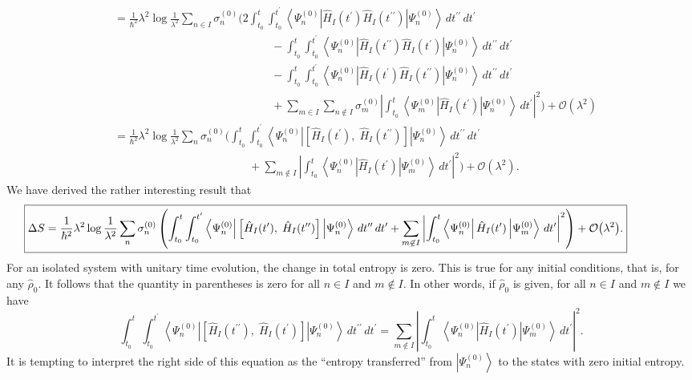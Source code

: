 \documentclass[11pt]{article}
\newcommand{\Od}[1]{\mathcal{O}{\left(#1\right)}}
\newcommand{\bra}[1]{\left\langle#1\right|}
\newcommand{\ket}[1]{\left|#1\right\rangle}
\newcommand{\op}[1]{\hat{#1}}
\theoremstyle{theorem}
\theoremstyle{remark}
\theoremstyle{step}
\theoremstyle{gap}
\begin{document}
\begin{align*}
&=\frac{1}{\hbar^2}\lambda^2 \log\frac{1}{\lambda^2} \sum_{n \in I} \sigma_n^{(0)} \Bigg(2\int_{t_0}^t \int_{t_0}^{t^\prime} \bra{\Psi_n^{(0)}} \op{H}_I (t^\prime) \op{H}_I(t^{\prime\prime}) \ket{\Psi_n^{(0)}}\,dt^{\prime\prime}\,dt^\prime  \\
&\hspace{14em}-\int_{t_0}^t \int_{t_0}^{t^\prime} \bra{\Psi_n^{(0)}} \op{H}_I (t^{\prime\prime})\op{H}_I (t^{\prime}) \ket{\Psi_n^{(0)}}\,dt^{\prime\prime}\,dt^\prime \\
&\hspace{14em}-\int_{t_0}^t \int_{t_0}^{t^\prime} \bra{\Psi_n^{(0)}} \op{H}_I (t^{\prime})\op{H}_I (t^{\prime\prime}) \ket{\Psi_n^{(0)}}\,dt^{\prime\prime}\,dt^\prime\\
&\hspace{14em}+\sum_{m \in I}\sum_{n\not\in I} \sigma_m^{(0)} \left| \int_{t_0}^t \bra{\Psi_m^{(0)}}\op{H}_I (t^\prime) \ket{\Psi_n^{(0)}}\,dt^\prime\right|^2 \Bigg) + \Od{\lambda^2} \\
&=\frac{1}{\hbar^2}\lambda^2 \log\frac{1}{\lambda^2} \sum_{n} \sigma_n^{(0)} \Bigg(\int_{t_0}^t \int_{t_0}^{t^\prime} \bra{\Psi_n^{(0)}} \left[\op{H}_I (t^\prime),\; \op{H}_I(t^{\prime\prime}) \right]\ket{\Psi_n^{(0)}}\,dt^{\prime\prime}\,dt^\prime \\
&\hspace{12em}+\sum_{m\not\in I} \left| \int_{t_0}^t \bra{\Psi_n^{(0)}}\op{H}_I (t^\prime) \ket{\Psi_m^{(0)}}\,dt^\prime\right|^2 \Bigg) + \Od{\lambda^2}.
\end{align*}
We have derived the rather interesting result that
\begin{equation}
\hspace{-4.5em}
\boxed{\Delta S = \frac{1}{\hbar^2}\lambda^2 \log\frac{1}{\lambda^2} \sum_{n} \sigma_n^{(0)} \left(\int_{t_0}^t \int_{t_0}^{t^\prime} \bra{\Psi_n^{(0)}} \left[\op{H}_I (t^\prime),\; \op{H}_I(t^{\prime\prime}) \right]\ket{\Psi_n^{(0)}}\,dt^{\prime\prime}\,dt^\prime +\sum_{m\not\in I} \left| \int_{t_0}^t \bra{\Psi_n^{(0)}}\op{H}_I (t^\prime) \ket{\Psi_m^{(0)}}\,dt^\prime\right|^2 \right) + \Od{\lambda^2}.}
\end{equation}
For an isolated system with unitary time evolution, the change in total entropy is zero. This is true for any initial conditions, that is, for any \(\op{\rho}_0\). It follows that the quantity in parentheses is zero for all \(n \in I\) and \(m \not\in I\). In other words, if \(\op{\rho}_0\) is given, for all \(n \in I\) and \(m \not\in I\) we have
\begin{equation}
\boxed{\int_{t_0}^t \int_{t_0}^{t^\prime} \bra{\Psi_n^{(0)}} \left[\op{H}_I (t^{\prime\prime}),\; \op{H}_I(t^{\prime}) \right]\ket{\Psi_n^{(0)}}\,dt^{\prime\prime}\,dt^\prime = \sum_{m\not\in I} \left| \int_{t_0}^t \bra{\Psi_n^{(0)}}\op{H}_I (t^\prime) \ket{\Psi_m^{(0)}}\,dt^\prime\right|^2.}
\end{equation}
It is tempting to interpret the right side of this equation as the ``entropy transferred'' from \(\ket{\Psi_n^{(0)}}\) to the states with zero initial entropy.
\end{document}
